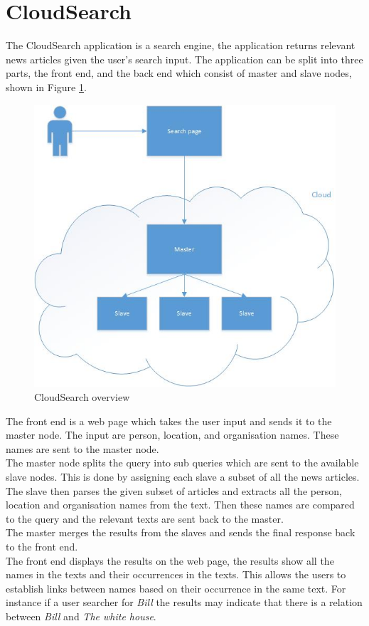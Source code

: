 \documentclass{acm_proc_article-sp}
\begin{document}
\section{CloudSearch}
The CloudSearch application is a search engine, the application returns relevant news articles given the user's search input.
The application can be split into three parts, the front end, and the back end which consist of master and slave nodes, shown in Figure \ref{fig:overview}.
\begin{figure}[ht!]
\centering
\includegraphics[scale=0.5]{CloudSearchOverview.jpg}
\caption{CloudSearch overview \label{fig:overview}}
\end{figure}
The front end is a web page which takes the user input and sends it to the master node.
The input are person, location, and organisation names.
These names are sent to the master node.\\
The master node  splits the query into sub queries which are sent to the available slave nodes.
This is done by assigning each slave a subset of all the news articles.\\
The slave then parses the given subset of articles and extracts all the person, location and organisation names from the text.
Then these names are compared to the query and the relevant texts are sent back to the master.\\
The master merges the results from the slaves and sends the final response back to the front end.\\
The front end displays the results on the web page, the results show all the names in the texts and their occurrences in the texts.
This allows the users to establish links between names based on their occurrence in the same text.
For instance if a user searcher for \textit{Bill} the results may indicate that there is a relation between \textit{Bill} and \textit{The white house}.\\
\end{document}
